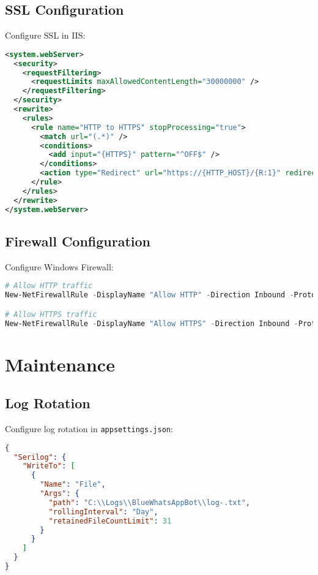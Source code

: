 \subsection{SSL Configuration}
Configure SSL in IIS:

\begin{lstlisting}[language=xml]
<system.webServer>
  <security>
    <requestFiltering>
      <requestLimits maxAllowedContentLength="30000000" />
    </requestFiltering>
  </security>
  <rewrite>
    <rules>
      <rule name="HTTP to HTTPS" stopProcessing="true">
        <match url="(.*)" />
        <conditions>
          <add input="{HTTPS}" pattern="^OFF$" />
        </conditions>
        <action type="Redirect" url="https://{HTTP_HOST}/{R:1}" redirectType="Permanent" />
      </rule>
    </rules>
  </rewrite>
</system.webServer>
\end{lstlisting}

\subsection{Firewall Configuration}
Configure Windows Firewall:

\begin{lstlisting}[language=powershell]
# Allow HTTP traffic
New-NetFirewallRule -DisplayName "Allow HTTP" -Direction Inbound -Protocol TCP -LocalPort 80 -Action Allow

# Allow HTTPS traffic
New-NetFirewallRule -DisplayName "Allow HTTPS" -Direction Inbound -Protocol TCP -LocalPort 443 -Action Allow
\end{lstlisting}

\section{Maintenance}

\subsection{Log Rotation}
Configure log rotation in \texttt{appsettings.json}:

\begin{lstlisting}[language=json]
{
  "Serilog": {
    "WriteTo": [
      {
        "Name": "File",
        "Args": {
          "path": "C:\\Logs\\BlueWhatsAppBot\\log-.txt",
          "rollingInterval": "Day",
          "retainedFileCountLimit": 31
        }
      }
    ]
  }
}
\end{lstlisting}

